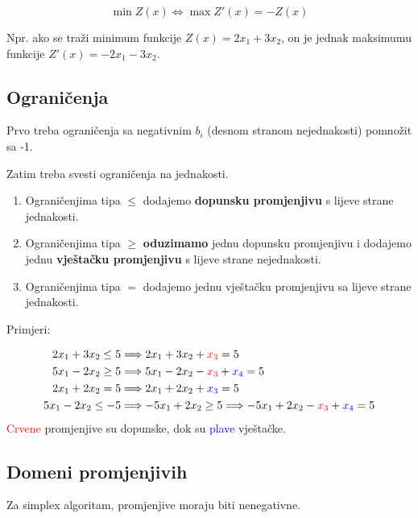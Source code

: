 \documentclass[12pt,a4paper]{article}
\begin{document}
\begin{equation}
\min Z(x) \Leftrightarrow \max Z'(x)=-Z(x)
\end{equation}

Npr. ako se traži minimum funkcije $Z(x)=2x_1+3x_2$, on je jednak maksimumu funkcije $Z'(x)=-2x_1-3x_2$.

\subsection{Ograničenja}

Prvo treba ograničenja sa negativnim $b_i$ (desnom stranom nejednakosti) pomnožit sa -1.

\noindent Zatim treba svesti ograničenja na jednakosti.

\begin{enumerate}
    \item Ograničenjima tipa $\leq$ dodajemo \textbf{dopunsku promjenjivu} s lijeve strane jednakosti.
    \item Ograničenjima tipa $\geq$ \textbf{oduzimamo} jednu dopunsku promjenjivu i dodajemo jednu \textbf{vještačku promjenjivu} s lijeve strane nejednakosti.
    \item Ograničenjima tipa $=$ dodajemo jednu vještačku promjenjivu sa lijeve strane jednakosti.
\end{enumerate}

Primjeri:

\begin{equation}
\begin{aligned}
    2x_1+3x_2\leq5 &\Longrightarrow2x_1+3x_2+\textcolor{red}{x_3} = 5\\
    5x_1-2x_2\geq5 &\Longrightarrow5x_1-2x_2-\textcolor{red}{x_3}+\textcolor{blue}{x_4} = 5\\
    2x_1+2x_2=5 &\Longrightarrow2x_1+2x_2+\textcolor{blue}{x_3} = 5\\
    5x_1-2x_2\leq-5 &\Longrightarrow-5x_1+2x_2\geq5\Longrightarrow-5x_1+2x_2-\textcolor{red}{x_3}+\textcolor{blue}{x_4}=5\\
\end{aligned}
\end{equation}
\textcolor{red}{Crvene} promjenjive su dopunske, dok su \textcolor{blue}{plave} vještačke. 

\subsection{Domeni promjenjivih}

Za simplex algoritam, promjenjive moraju biti nenegativne.
\end{document}
